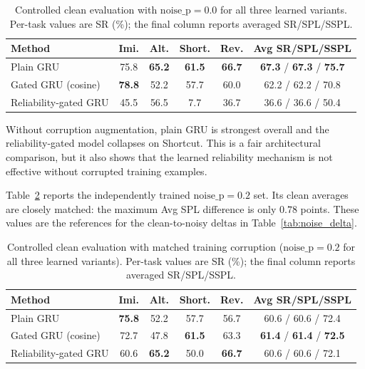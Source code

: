 \documentclass[conference]{IEEEtran}
\begin{document}
\begin{table}[htbp]
\centering
\caption{Controlled clean evaluation with
$\mathrm{noise\_p}{=}0.0$ for all three learned variants. Per-task values are
SR (\%); the final column reports averaged SR/SPL/SSPL.}
\label{tab:clean_noise00}
\small
\setlength{\tabcolsep}{3.5pt}
\begin{tabular}{lcccc c}
\toprule
Method & Imi. & Alt. & Short. & Rev. & Avg SR/SPL/SSPL \\
\midrule
Plain GRU             & 75.8 & \textbf{65.2} & \textbf{61.5} & \textbf{66.7} & \textbf{67.3} / \textbf{67.3} / \textbf{75.7} \\
Gated GRU (cosine)    & \textbf{78.8} & 52.2 & 57.7 & 60.0 & 62.2 / 62.2 / 70.8 \\
Reliability-gated GRU & 45.5 & 56.5 & 7.7 & 36.7 & 36.6 / 36.6 / 50.4 \\
\bottomrule
\end{tabular}
\end{table}

Without corruption augmentation, plain GRU is strongest overall and the
reliability-gated model collapses on Shortcut. This is a fair architectural
comparison, but it also shows that the learned reliability mechanism is not
effective without corrupted training examples.

Table~\ref{tab:matched_clean} reports the independently trained
$\mathrm{noise\_p}{=}0.2$ set. Its clean averages are closely matched: the
maximum Avg SPL difference is only $0.78$ points. These values are the
references for the clean-to-noisy deltas in Table~\ref{tab:noise_delta}.

\begin{table}[htbp]
\centering
\caption{Controlled clean evaluation with matched training corruption
($\mathrm{noise\_p}{=}0.2$ for all three learned variants). Per-task values
are SR (\%); the final column reports averaged SR/SPL/SSPL.}
\label{tab:matched_clean}
\small
\setlength{\tabcolsep}{3.5pt}
\begin{tabular}{lcccc c}
\toprule
Method & Imi. & Alt. & Short. & Rev. & Avg SR/SPL/SSPL \\
\midrule
Plain GRU             & \textbf{75.8} & 52.2 & 57.7 & 56.7 & 60.6 / 60.6 / 72.4 \\
Gated GRU (cosine)    & 72.7 & 47.8 & \textbf{61.5} & 63.3 & \textbf{61.4} / \textbf{61.4} / \textbf{72.5} \\
Reliability-gated GRU & 60.6 & \textbf{65.2} & 50.0 & \textbf{66.7} & 60.6 / 60.6 / 72.1 \\
\bottomrule
\end{tabular}
\end{table}
\end{document}
